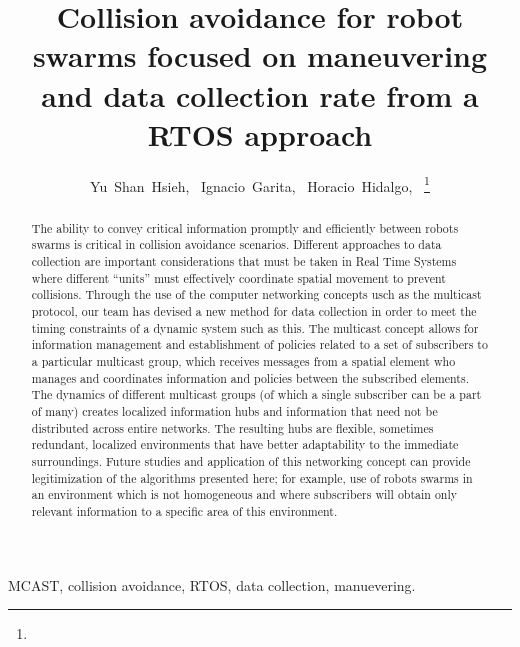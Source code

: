 \documentclass[journal]{IEEEtran}
\begin{document}
\title{Collision avoidance for robot swarms focused on maneuvering and data collection rate from a RTOS approach}

\author{Yu~Shan~Hsieh,~
	Ignacio~Garita,~
        Horacio~Hidalgo,~%
\thanks{}%
%
}

\maketitle

\begin{abstract}
The ability to convey critical information promptly and efficiently between robots
swarms is critical in collision avoidance scenarios. Different approaches to data collection
are important considerations that must be taken in Real Time Systems where different “units” must
effectively coordinate spatial movement to prevent collisions. Through the use of the computer
networking concepts usch as the multicast protocol, our team has devised a new method for
data collection in order to meet the timing constraints of a dynamic system such as this. The multicast
concept allows for information management and establishment of policies related to a set of
subscribers to a particular multicast group, which receives messages from a spatial element who
manages and coordinates information and policies between the subscribed elements. The dynamics
of different multicast groups (of which a single subscriber can be a part of many) creates localized
information hubs and information that need not be distributed across entire networks. The resulting
hubs are flexible, sometimes redundant, localized environments that have better adaptability
to the immediate surroundings. Future studies and application of this networking concept can
provide legitimization of the algorithms presented here; for example, use of robots swarms in an
environment which is not homogeneous and where subscribers will obtain only relevant information
to a specific area of this environment.
\end{abstract}

\begin{IEEEkeywords}
MCAST, collision avoidance, RTOS, data collection, manuevering.
\end{IEEEkeywords}
\end{document}
